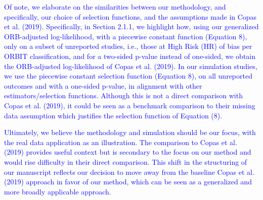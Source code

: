 \documentclass{article}
\begin{document}


\bigskip
\textcolor{blue}{Of note, we elaborate on the similarities between our methodology, and specifically, our choice of selection functions, and the assumptions made in Copas et al. (2019). Specifically, in Section 2.1.1, we highlight how, using our generalized ORB-adjusted log-likelihood, with a piecewise constant function (Equation 8), only on a subset of unreported studies, i.e., those at High Risk (HR) of bias per ORBIT classification, and for a two-sided p-value instead of one-sided, we obtain the ORB-adjusted log-likelihood of Copas et al. (2019). In our simulation studies, we use the piecewise constant selection function (Equation 8), on all unreported outcomes and with a one-sided p-value, in alignment with other estimators/selection functions. Although this is not a direct comparison with Copas et al. (2019), it could be seen as a benchmark comparison to their missing data assumption which justifies the selection function of Equation (8).}

\bigskip 
\textcolor{blue}{Ultimately, we believe the methodology and simulation should be our focus, with the real data application as an illustration. The comparison to Copas et al. (2019) provides useful context but is secondary to the focus on our method and would rise difficulty in their direct comparison. This shift in the structuring of our manuscript reflects our decision to move away from the baseline Copas et al. (2019) approach in favor of our method, which can be seen as a generalized and more broadly applicable approach.}
\end{document}
